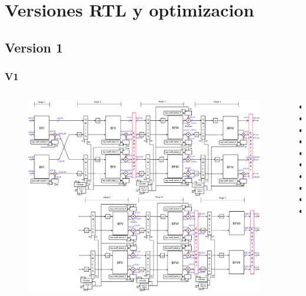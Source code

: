 \documentclass[t]{beamer}
\begin{document}
\section{Versiones RTL y optimizacion}

\subsection{Version 1}
\begin{frame}
\frametitle{V1}	
\begin{columns}[T] %
\begin{column}{.7\textwidth}
\vspace*{-0.9cm}
 \begin{figure}[ht]
    \centering
  \includegraphics[height=0.72\paperheight]{image/V1_esquema_p.eps} \\
    \end{figure}

\end{column}%

\begin{column}{.3\textwidth}


\begin{itemize}
\item
\item
\item
\item
\item
\item
\item
\item
\item
\item
\end{itemize}

\end{column}
\end{columns}

\end{frame}
\end{document}
